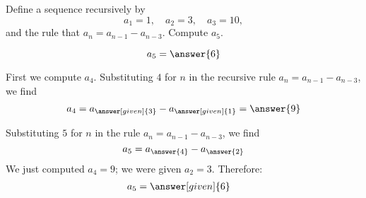 \documentclass{ximera}
\author{Jim Talamo}
\begin{document}
\begin{exercise}

Define a sequence recursively by
\[
a_1 = 1, \quad a_2 = 3, \quad a_3 = 10,
\]
and the rule that $a_n = a_{n-1} - a_{n-3}$.  Compute $a_5$.


\[
a_5 = \answer{6}
\]
\begin{hint}
  First we compute $a_4$.  Substituting $4$ for $n$ in the recursive
  rule $a_n = a_{n-1} - a_{n-3}$, we find
  \begin{align*}
  a_4 &= a_{\answer[given]{3}} - a_{\answer[given]{1}} = \answer{9} \\
  \end{align*}
  
  \begin{question}
  Substituting $5$ for $n$ in the rule $a_n = a_{n-1} - a_{n-3}$, we find
  \[
  a_5 = a_{\answer{4}} - a_{\answer{2}}
  \]
  We just computed $a_4 = 9$; we were given $a_2 = 3$.  Therefore:
  \begin{align*}
    a_5&= \answer[given]{6} 
  \end{align*}
  \end{question}
\end{hint}

\end{exercise}
\end{document}
